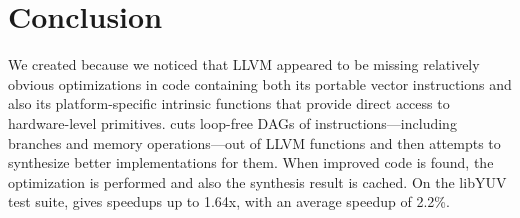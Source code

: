\section{Conclusion}
\label{sec:conc}

We created \minotaur{} because we noticed that LLVM appeared to be missing
relatively obvious optimizations in code containing both its portable
vector instructions and also its platform-specific intrinsic
functions that provide direct access to hardware-level primitives.
%
\minotaur{} cuts loop-free DAGs of instructions---including branches and
memory operations---out of LLVM functions and then attempts to
synthesize better implementations for them.
%
When improved code is found, the optimization is performed and also
the synthesis result is cached.
%
On the libYUV test suite, \minotaur{} gives speedups up to 1.64x,
with an average speedup of 2.2\%.

